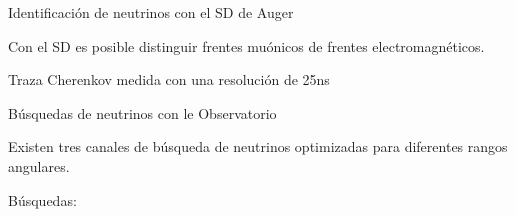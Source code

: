 	\begin{frame}{Identificaci\'on de neutrinos con el SD de Auger}
		\begin{alertblock}{}\centering
		Con el SD es posible distinguir frentes mu\'onicos de frentes electromagn\'eticos.
		\end{alertblock}
		
		\begin{block}{Traza Cherenkov medida con una resoluci\'on de 25ns}
		\centering
		\end{block}
		
	\end{frame}

	\begin{frame}{B\'usquedas de neutrinos con le Observatorio}
		\begin{exampleblock}{}\centering
		Existen tres canales de b\'usqueda de neutrinos optimizadas para diferentes rangos angulares.
		\end{exampleblock}
		
		\begin{block}{B\'usquedas:}
		\centering
		\end{block}
		
	\end{frame}
	
	